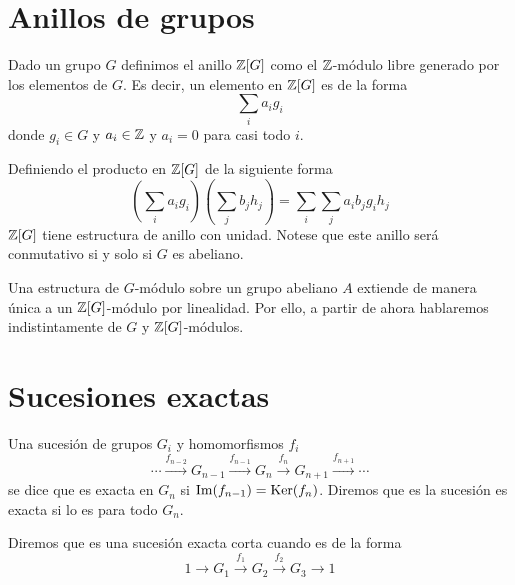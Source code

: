 %

\section{Anillos de grupos}

Dado un grupo $G$ definimos el anillo $\mathbb{Z}[G]$ como el $\mathbb{Z}$-módulo libre generado por los elementos de $G$. Es decir, un elemento en $\mathbb{Z}[G]$ es de la forma
\begin{equation*}
	\sum_i a_ig_i
\end{equation*}
donde $g_i\in G$ y $a_i\in \mathbb{Z}$ y $a_i=0$ para casi todo $i$.

Definiendo el producto en $\mathbb{Z}[G]$ de la siguiente forma
\begin{equation*}
	\left(\sum_i a_ig_i\right) \left(\sum_jb_jh_j\right) = \sum_i\sum_j a_ib_jg_ih_j
\end{equation*}
$\mathbb{Z}[G]$ tiene estructura de anillo con unidad. Notese que este anillo será conmutativo si y solo si $G$ es abeliano.

\begin{observacion}
	Una estructura de $G$-módulo sobre un grupo abeliano $A$ extiende de manera única a un $\mathbb{Z}[G]$-módulo por linealidad.
	Por ello, a partir de ahora hablaremos indistintamente de $G$ y $\mathbb{Z}[G]$-módulos.
\end{observacion}

\section{Sucesiones exactas}

\begin{definicion}
	Una sucesión de grupos $G_i$ y homomorfismos $f_i$
	\begin{equation*}
		\cdots \xrightarrow{f_{n-2}} G_{n-1} \xrightarrow{f_{n-1}} G_n \xrightarrow{f_{n}} G_{n+1} \xrightarrow{f_{n+1}} \cdots
	\end{equation*}
	se dice que es exacta en $G_n$ si $\operatorname{Im}(f_{n-1}) = \operatorname{Ker}(f_{n})$. Diremos que es la sucesión es exacta si lo es para todo $G_n$.
	
	Diremos que es una sucesión exacta corta cuando es de la forma
	\begin{equation}\label{eq:sec}
		1\xrightarrow{} G_1 \xrightarrow{f_1} G_2\xrightarrow{f_2} G_3 \xrightarrow{} 1
	\end{equation}
\end{definicion}

